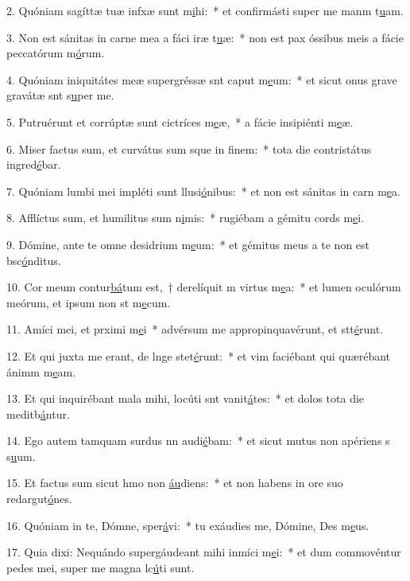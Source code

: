 2. Quóniam sagíttæ tuæ infxæ sunt m\uline{i}hi:~* et confirmásti super me manm t\uline{u}am.\par 
3. Non est sánitas in carne mea a fáci iræ t\uline{u}æ:~* non est pax óssibus meis a fácie peccatórum m\uline{ó}rum.\par 
4. Quóniam iniquitátes meæ supergréssæ snt caput m\uline{e}um:~* et sicut onus grave gravátæ snt s\uline{u}per me.\par 
5. Putruérunt et corrúptæ sunt cictríces m\uline{e}æ,~* a fácie insipiénti m\uline{e}æ.\par 
6. Miser factus sum, et curvátus sum sque in f\uline{i}nem:~* tota die contristátus ingred\uline{é}bar.\par 
7. Quóniam lumbi mei impléti sunt llusi\uline{ó}nibus:~* et non est sánitas in carn m\uline{e}a.\par 
8. Afflíctus sum, et humilitus sum n\uline{i}mis:~* rugiébam a gémitu cords m\uline{e}i.\par 
9. Dómine, ante te omne desidrium m\uline{e}um:~* et gémitus meus a te non est bsc\uline{ó}nditus.\par 
10. Cor meum contur\uline{bá}tum est,~† derelíquit m virtus m\uline{e}a:~* et lumen oculórum meórum, et ipsum non st m\uline{e}cum.\par 
11. Amíci mei, et prximi m\uline{e}i~* advérsum me appropinquavérunt, et stt\uline{é}runt.\par 
12. Et qui juxta me erant, de lnge stet\uline{é}runt:~* et vim faciébant qui quærébant ánimm m\uline{e}am.\par 
13. Et qui inquirébant mala mihi, locúti snt vanit\uline{á}tes:~* et dolos tota die meditb\uline{á}ntur.\par 
14. Ego autem tamquam surdus nn audi\uline{é}bam:~* et sicut mutus non apériens s s\uline{u}um.\par 
15. Et factus sum sicut hmo non \uline{áu}diens:~* et non habens in ore suo redargut\uline{ó}nes.\par 
16. Quóniam in te, Dómne, sper\uline{á}vi:~* tu exáudies me, Dómine, Des m\uline{e}us.\par 
17. Quia dixi: Nequándo supergáudeant mihi inmíci m\uline{e}i:~* et dum commovéntur pedes mei, super me magna lc\uline{ú}ti sunt.\par 
